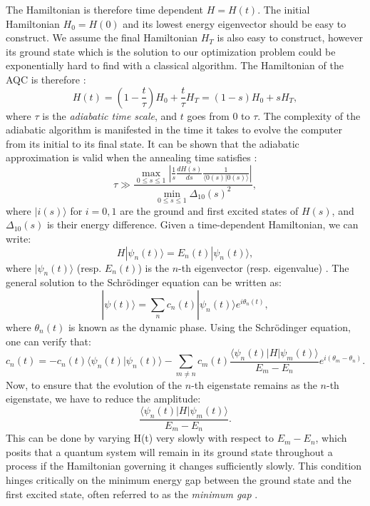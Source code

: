 The Hamiltonian is therefore time dependent $H = H(t)$. The initial Hamiltonian $H_0 = H(0)$ and its lowest energy eigenvector should be easy to construct. We assume the final Hamiltonian $H_T$ is also easy to construct, however its ground state which is the solution to our optimization problem could be exponentially hard to find with a classical algorithm. The Hamiltonian of the AQC is therefore \cite{berwald2018mathematics}:
\begin{equation}
H(t) = \left(1 - \frac{t}{\tau}\right)H_0 + \frac{t}{\tau} H_T = (1 - s)H_0 + sH_T,
\end{equation}
where $\tau$ is the \textit{adiabatic time scale}, and $t$ goes from 0 to $\tau$. The complexity of the adiabatic algorithm is manifested in the time it takes to evolve the computer from its initial to its final state. It can be shown that the adiabatic approximation is valid when the annealing time satisfies \cite{Tanaka2017QuantumSG}:
\begin{equation}
\tau \gg \frac{\max_{0 \leq s \leq 1}\left|\frac{1}{s}\frac{dH(s)}{ds} \frac{1}{\langle 0(s) | 0(s) \rangle}\right|}{\min_{0 \leq s \leq 1}\Delta_{10}(s)^2},
\end{equation}
where $|i(s) \rangle$ for $i = 0, 1$ are the ground and first excited states of $H(s)$, and $\Delta_{10}(s)$ is their energy difference.
Given a time-dependent Hamiltonian, we can write:
\begin{equation}
H | \psi_n(t) \rangle = E_n(t) | \psi_n(t) \rangle,
\end{equation}
where $| \psi_n(t) \rangle$ (resp. $E_n(t)$) is the $n$-th eigenvector (resp. eigenvalue) \cite{Tanaka2017QuantumSG}. The general solution to the Schrödinger equation can be written as:
\begin{equation}
| \psi(t) \rangle = \sum_n c_n(t) | \psi_n(t) \rangle e^{i \theta_n(t)},
\end{equation}
where $\theta_n(t)$ is known as the dynamic phase. Using the Schrödinger equation, one can verify that:
\begin{equation}
c_n(t) = -c_n(t) \langle \psi_n(t) | \psi_n(t) \rangle - \sum_{m \neq n} c_m(t) \frac{\langle \psi_n(t) | H | \psi_m(t) \rangle}{E_m - E_n} e^{i(\theta_m - \theta_n)}.
\end{equation}
Now, to ensure that the evolution of the $n$-th eigenstate remains as the $n$-th eigenstate, we have to reduce the amplitude:
\begin{equation}
\frac{\langle \psi_n(t) | H | \psi_m(t) \rangle}{E_m - E_n}.
\end{equation}
This can be done by varying H(t) very slowly with respect to ${E_m - E_n}$, which posits that a quantum system will remain in its ground state throughout a process if the Hamiltonian governing it changes sufficiently slowly. This condition hinges critically on the minimum energy gap between the ground state and the first excited state, often referred to as the \textit{minimum gap} \cite{QAKadowaki1998QuantumAI}.
